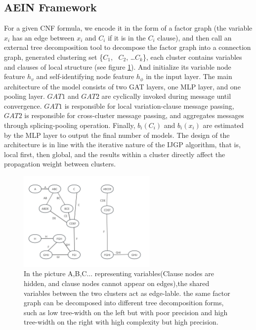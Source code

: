 \subsection{AEIN Framework}
For a given CNF formula, we encode it in the form of a factor graph (the variable \(x_i\) has an 
edge between \(x_i\) and \(C_i\) if it is in the \(C_i\) clause), and then call an external tree 
decomposition tool to decompose the factor graph into a connection graph, generated clustering set 
\{\(C_1\), \ \(C_2\), \ldots \(C_k\)\}, each cluster contains variables and clauses of local structure 
(see figure \ref{fig2}). And initialize its variable node feature \(h_v\) and self-identifying node 
feature \(h_\phi\) in the input layer. The main architecture of the model consists of two GAT layers, 
one MLP layer, and one pooling layer. \(GAT1\) and \(GAT2\) are cyclically invoked during message 
until convergence. \(GAT1\) is responsible for local variation-clause message passing, \(GAT2\) 
is responsible for cross-cluster message passing, and aggregates messages through splicing-pooling 
operation. Finally, \(b_i(C_i)\) and \(b_i(x_i)\) are estimated by the MLP layer to output the final 
number of models. The design of the architecture is in line with the iterative nature of the IJGP 
algorithm, that is, local first, then global, and the results within a cluster directly affect the 
propagation weight between clusters.
\begin{figure}[h]
\centering 
\includegraphics[width=0.6\textwidth]{png/JG.png}
\caption{In the picture A,B,C... representing variables(Clause nodes are hidden, and clause nodes 
cannot appear on edges),the shared variables between the two clusters act as edge-lable. the same 
factor graph can be decomposed into different tree decomposition forms, such as low tree-width on the 
left but with poor precision and high tree-width on the right with high complexity but high precision.} 
\label{fig2}
\end{figure}
